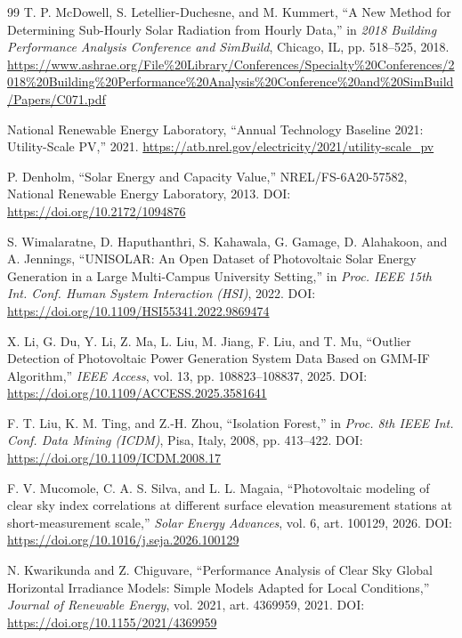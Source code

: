 \documentclass[12pt,a4paper]{article}
\begin{document}
\begin{thebibliography}{99}
T. P. McDowell, S. Letellier-Duchesne, and M. Kummert,
``A New Method for Determining Sub-Hourly Solar Radiation from Hourly Data,''
in \textit{2018 Building Performance Analysis Conference and SimBuild}, Chicago, IL, pp. 518--525, 2018.
\url{https://www.ashrae.org/File%20Library/Conferences/Specialty%20Conferences/2018%20Building%20Performance%20Analysis%20Conference%20and%20SimBuild/Papers/C071.pdf}

National Renewable Energy Laboratory,
``Annual Technology Baseline 2021: Utility-Scale PV,'' 2021.
\url{https://atb.nrel.gov/electricity/2021/utility-scale_pv}

P. Denholm,
``Solar Energy and Capacity Value,'' NREL/FS-6A20-57582, National Renewable Energy Laboratory, 2013.
DOI: \url{https://doi.org/10.2172/1094876}

S. Wimalaratne, D. Haputhanthri, S. Kahawala, G. Gamage, D. Alahakoon, and A. Jennings,
``UNISOLAR: An Open Dataset of Photovoltaic Solar Energy Generation in a Large Multi-Campus University Setting,''
in \textit{Proc. IEEE 15th Int. Conf. Human System Interaction (HSI)}, 2022.
DOI: \url{https://doi.org/10.1109/HSI55341.2022.9869474}

X. Li, G. Du, Y. Li, Z. Ma, L. Liu, M. Jiang, F. Liu, and T. Mu,
``Outlier Detection of Photovoltaic Power Generation System Data Based on GMM-IF Algorithm,''
\textit{IEEE Access}, vol. 13, pp. 108823--108837, 2025.
DOI: \url{https://doi.org/10.1109/ACCESS.2025.3581641}

F. T. Liu, K. M. Ting, and Z.-H. Zhou,
``Isolation Forest,''
in \textit{Proc. 8th IEEE Int. Conf. Data Mining (ICDM)}, Pisa, Italy, 2008, pp. 413--422.
DOI: \url{https://doi.org/10.1109/ICDM.2008.17}

F. V. Mucomole, C. A. S. Silva, and L. L. Magaia,
``Photovoltaic modeling of clear sky index correlations at different surface elevation measurement stations at short-measurement scale,''
\textit{Solar Energy Advances}, vol. 6, art. 100129, 2026.
DOI: \url{https://doi.org/10.1016/j.seja.2026.100129}

N. Kwarikunda and Z. Chiguvare,
``Performance Analysis of Clear Sky Global Horizontal Irradiance Models: Simple Models Adapted for Local Conditions,''
\textit{Journal of Renewable Energy}, vol. 2021, art. 4369959, 2021.
DOI: \url{https://doi.org/10.1155/2021/4369959}


\end{thebibliography}
\end{document}
